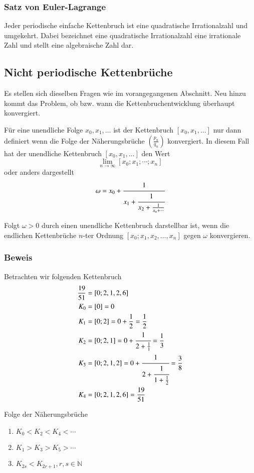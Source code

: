 \subsubsection{Satz von Euler-Lagrange}
Jeder periodische einfache Kettenbruch ist eine quadratische
Irrationalzahl und umgekehrt. Dabei bezeichnet eine quadratische
Irrationalzahl eine irrationale Zahl und stellt eine algebraische
Zahl dar.

\subsection{Nicht periodische Kettenbrüche}
Es stellen sich dieselben Fragen wie im vorangegangenen Abschnitt.
Neu hinzu kommt das Problem, ob bzw. wann die Kettenbruchentwicklung
überhaupt konvergiert.

Für eine unendliche Folge $x_0,x_1,\dots$ ist der Kettenbruch
$[x_0,x_1,\dots]$ nur dann definiert wenn die Folge der Näherungsbrüche
$(\frac{p_n}{q_n})$ konvergiert. In diesem Fall hat der unendliche
Kettenbruch $[x_0,x_1,\dots]$ den Wert
\begin{equation}
\lim_{n\to\infty} [x_0;x_1;\cdots;x_n]
\end{equation}
oder anders dargestellt
\begin{equation}
\omega
=
x_0 + \cfrac{1}{x_1+\cfrac{1}{x_2+\frac{1}{x_n+\cdots}}}
\end{equation}

Folgt $\omega > 0$ durch einen unendliche Kettenbruch darstellbar
ist, wenn die endlichen Kettenbrüche $n$-ter Ordnung
$[x_0;x_1,x_2,\dots,x_n]$ gegen $\omega$ konvergieren.

\subsubsection{Beweis}
Betrachten wir folgenden Kettenbruch
\begin{align*}
\frac{19}{51} &= [0;2,1,2,6]
\\
	K_0 &= [0] = 0
\\
	K_1 &= [0;2] = 0 + \frac{1}{2} = \frac{1}{2}
\\
	K_2 &= [0;2,1] = 0 + \cfrac{1}{2+\frac{1}{1}} = \frac{1}{3}
\\
	K_3 &= [0;2,1,2] = 0 + \cfrac{1}{2+\cfrac{1}{1+\frac{1}{2}}} = \frac{3}{8}
\\
	K_4 &= [0;2,1,2,6] = \frac{19}{51}
\end{align*}

Folge der Näherungsbrüche
\begin{enumerate}
\item
$K_0 < K_2 < K_4 < \cdots$
\item
$K_1 > K_3 > K_5 > \cdots$
\item
$K_{2s} < K_{2r+1}, r,s \in \mathbb{N}$
\end{enumerate}

